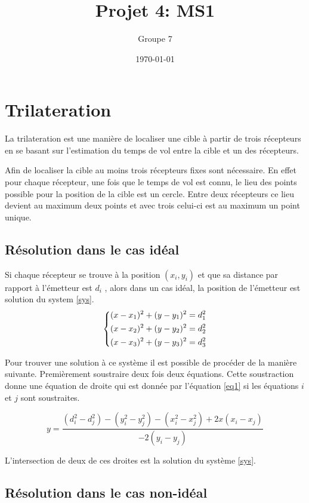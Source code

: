 \documentclass[10pt,a4paper]{article}
\begin{document}
\title{Projet 4: MS1}
\date\today
\author{Groupe 7}
\maketitle

\section{Trilateration}
	La trilateration est une manière de localiser une cible à partir de trois récepteurs en se basant sur l'estimation du temps de vol entre la cible et un des récepteurs. 
		
		
	Afin de localiser la cible au moins trois récepteurs fixes sont nécessaire. En effet pour chaque récepteur, une fois que le temps de vol est connu, le lieu des points possible pour la position de la cible est un cercle. Entre deux récepteurs ce lieu devient au maximum deux points et avec trois celui-ci est au maximum un point unique. 
		\subsection{Résolution dans le cas idéal}
		Si chaque récepteur se trouve à la position $(x_i , y_i)$ et que sa distance par rapport à l'émetteur est $d_i$ , alors dans un cas idéal, la position de l'émetteur est solution du system \ref{sys}.  
		\begin{equation}
		\begin{dcases}
			(x - x_1)^2 + (y-y_1)^2 = d_1^2 \\
			(x - x_2)^2 + (y-y_2)^2 = d_2^2 \\
			(x - x_3)^2 + (y-y_3)^2 = d_3^2 
		\end{dcases}
		\label{sys}
		\end{equation}
		
		Pour trouver une solution à ce système il est possible de procéder de la manière suivante. Premièrement soustraire deux fois deux équations. Cette soustraction donne une équation de droite qui est donnée par l'équation \ref{eq1} si les équations $i$ et $j$ sont soustraites.
		
		\begin{equation}
			\label{eq1}
			y = \frac{(d_i^2 - d_j^2) - (y_i^2 -y_j^2)-(x_i^2 - x_j^2) + 2x(x_i-x_j)}{-2(y_i-y_j)}
		\end{equation}
		
		L'intersection de deux de ces droites est la solution du système \ref{sys}. 
		
		\subsection{Résolution dans le cas non-idéal}
\end{document}

